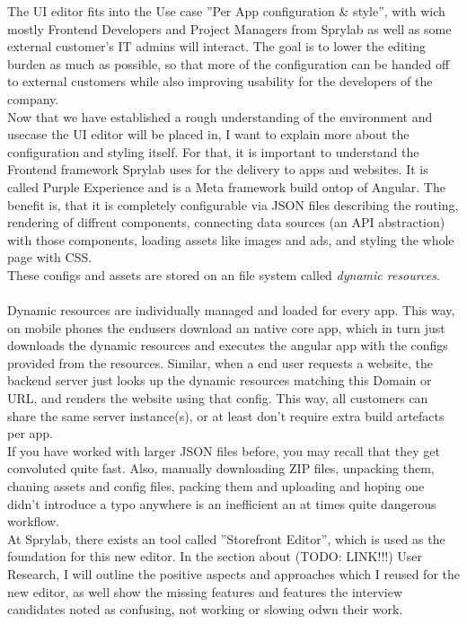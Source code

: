 The UI editor fits into the Use case ''Per App configuration \& style'', with wich mostly Frontend Developers and Project Managers from Sprylab as well as some external customer's IT admins will interact. The goal is to lower the editing burden as much as possible, so that more of the configuration can be handed off to external customers while also improving usability for the developers of the company.
\\
Now that we have established a rough understanding of the environment and usecase the UI editor will be placed in, I want to explain more about the configuration and styling itself.
For that, it is important to understand the Frontend framework Sprylab uses for the delivery to apps and websites. It is called Purple Experience and is a Meta framework build ontop of Angular. The benefit is, that it is completely configurable via JSON files describing the routing, rendering of diffrent components,
connecting data sources (an API abstraction) with those components, loading assets like images and ads, and styling the whole page with CSS.
\\
These configs and assets are stored on an file system called \label{def:DynamicResources} \textit{dynamic resources}.
\\\\
Dynamic resources are individually managed and loaded for every app. This way, on mobile phones the endusers download an native core app, which in turn just downloads the dynamic resources and executes the angular app with the configs provided from the resources.
Similar, when a end user requests a website, the backend server just looks up the dynamic resources matching this Domain or URL, and renders the website using that config.
This way, all customers can share the same server instance(s), or at least don't require extra build artefacts per app.
\\
If you have worked with larger JSON files before, you may recall that they get convoluted quite fast.
Also, manually downloading ZIP files, unpacking them, chaning assets and config files, packing them and uploading and hoping one didn't introduce a typo anywhere is an inefficient an at times quite dangerous workflow.
\\
At Sprylab, there exists an tool called ''Storefront Editor'', which is used as the foundation for this new editor.
In the section about (TODO: LINK!!!) User Research, I will outline the positive aspects and approaches which I reused for the new editor,
as well show the missing features and features the interview candidates noted as confusing, not working or slowing odwn their work.

